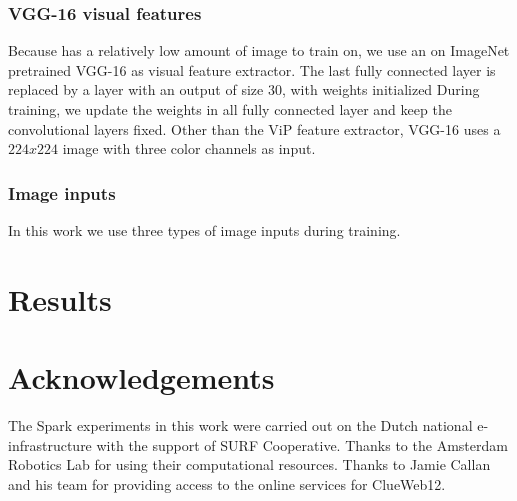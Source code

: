 \subsubsection{VGG-16 visual features}
Because \datasetname has a relatively low amount of image to train on, we use an on ImageNet pretrained VGG-16 \cite{simonyan2014very} as visual feature extractor. The last fully connected layer is replaced by a layer with an output of size $30$, with weights initialized  During training, we update the weights in all fully connected layer and keep the convolutional layers fixed. Other than the ViP feature extractor, VGG-16 uses a $224x224$ image with three color channels as input. 

\subsubsection{Image inputs}
In this work we use three types of image inputs during training. 

\section{Results}
\section{Acknowledgements}
The Spark experiments in this work were carried out on the Dutch national e-infrastructure with the support of SURF Cooperative. Thanks to the Amsterdam Robotics Lab for using their computational resources. Thanks to Jamie Callan and his team for providing access to the online services for ClueWeb12. 
